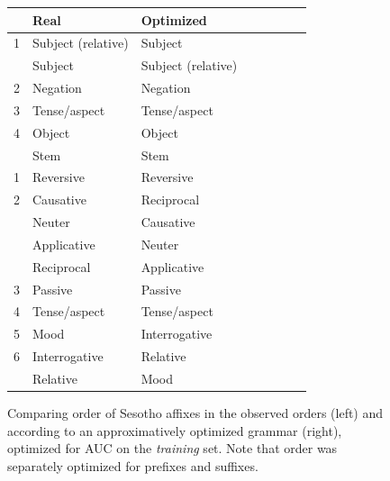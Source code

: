 \documentclass[11pt,letterpaper]{article}
\begin{document}
\begin{figure} %
    \centering
    \begin{tabular}{llllllll}
            &       Real & Optimized \\ \hline\hline
1 & Subject (relative) & Subject \\
 & Subject & Subject (relative) \\
2 & Negation & Negation \\
3 & Tense/aspect & Tense/aspect \\
4 & Object & Object \\
	    \hline
	    &Stem & Stem \\ \hline
	    1 & Reversive & Reversive \\
2 & Causative & Reciprocal \\
 & Neuter & Causative \\
 & Applicative & Neuter \\
 & Reciprocal & Applicative \\
3 & Passive & Passive \\
4 & Tense/aspect & Tense/aspect \\
5 & Mood & Interrogative \\
6 & Interrogative & Relative \\
 & Relative & Mood \\ \hline
    \end{tabular}
	\caption{Comparing order of Sesotho affixes in the observed orders (left) and according to an approximatively optimized grammar (right), optimized for AUC on the \emph{training} set. Note that order was separately optimized for prefixes and suffixes.}
    \label{fig:grammar-table-sesotho}
\end{figure}







\end{document}
